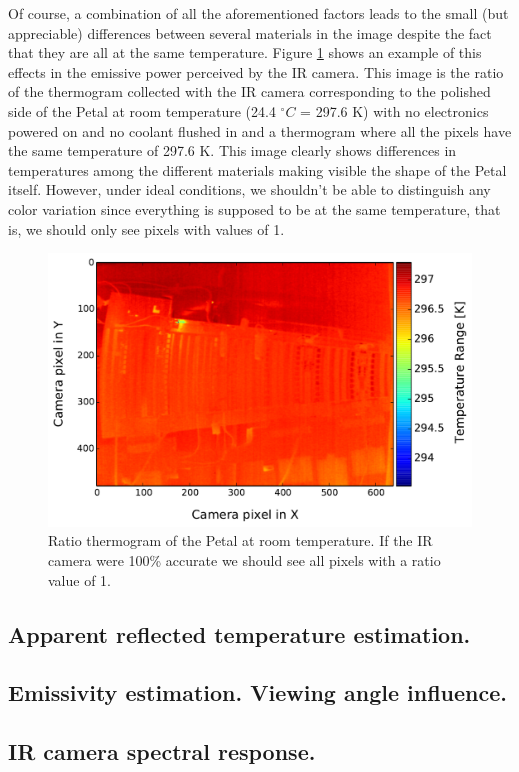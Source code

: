 		Of course, a combination of all the aforementioned factors leads to the small (but appreciable) differences between several materials in the image despite the fact that they are all at the same temperature. Figure \ref{fig3.4} shows an example of this effects in the emissive power perceived by the IR camera. This image is the ratio of the thermogram collected with the IR camera corresponding to the polished side of the Petal at room temperature (24.4 $^\circ C$ = 297.6 K) with no electronics powered on and no coolant flushed in and a thermogram where all the pixels have the same temperature of 297.6 K. This image clearly shows differences in temperatures among the different materials making visible the shape of the Petal itself. However, under ideal conditions, we shouldn't be able to distinguish any color variation since everything is supposed to be at the same temperature, that is, we should only see pixels with values of 1.
		
		\begin{figure}[ht!]
			\centering
			\captionsetup{justification=centering,margin=2cm}
			\includegraphics[scale=0.5]{Figures/Chapter03/thermo_Temp_201708091701_avg.pdf}
			\caption{Ratio thermogram of the Petal at room temperature. If the IR camera were 100\% accurate we should see all pixels with a ratio value of 1.}\label{fig3.4}
		\end{figure}
	
		\subsection{Apparent reflected temperature estimation.}\label{section3.1.1}
	
		\subsection{Emissivity estimation. Viewing angle influence.}\label{section3.1.2}
		
		\subsection{IR camera spectral response.}\label{section3.1.3}
		
		
	